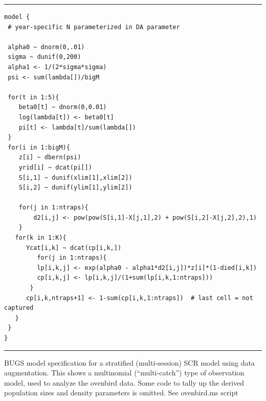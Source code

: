 \begin{panel}[htp]
\renewcommand{\baselinestretch}{1.0}
\centering
\rule[0.15in]{\textwidth}{.03in}
{\small
\begin{verbatim}
model {
 # year-specific N parameterized in DA parameter 

 alpha0 ~ dnorm(0,.01)
 sigma ~ dunif(0,200)
 alpha1 <- 1/(2*sigma*sigma)
 psi <- sum(lambda[])/bigM

 for(t in 1:5){
    beta0[t] ~ dnorm(0,0.01)   
    log(lambda[t]) <- beta0[t]
    pi[t] <- lambda[t]/sum(lambda[])
 } 
 for(i in 1:bigM){
    z[i] ~ dbern(psi)
    yrid[i] ~ dcat(pi[])
    S[i,1] ~ dunif(xlim[1],xlim[2])
    S[i,2] ~ dunif(ylim[1],ylim[2])

    for(j in 1:ntraps){
        d2[i,j] <- pow(pow(S[i,1]-X[j,1],2) + pow(S[i,2]-X[j,2],2),1)
    }
   for(k in 1:K){
      Ycat[i,k] ~ dcat(cp[i,k,])
         for(j in 1:ntraps){
         lp[i,k,j] <- exp(alpha0 - alpha1*d2[i,j])*z[i]*(1-died[i,k])        
         cp[i,k,j] <- lp[i,k,j]/(1+sum(lp[i,k,1:ntraps]))
       }
      cp[i,k,ntraps+1] <- 1-sum(cp[i,k,1:ntraps])  # last cell = not captured
   }  
 } 
} 
\end{verbatim}
}
\rule[-0.15in]{\textwidth}{.03in}
\caption{BUGS model specification for a stratified (multi-session) SCR
  model using data augmentation. This shows a multinomial
  (``multi-catch'') type of observation model, used to analyze the
  ovenbird data.  Some code to tally up the derived population sizes
  and density parameters is omitted. See ovenbird.ms script }
\label{multisession.panel.ovenbird}
\end{panel}

